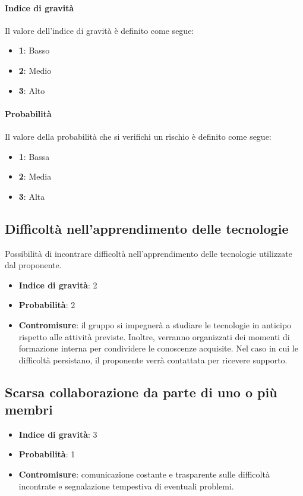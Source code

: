 \documentclass[italian,12pt]{article} %
\begin{document}
\paragraph{Indice di gravità} Il valore dell'indice di gravità è definito come segue:
\begin{itemize}
	\itemsep0em
	\item \textbf{1}: Basso
	\item \textbf{2}: Medio
	\item \textbf{3}: Alto
\end{itemize}

\paragraph{Probabilità} Il valore della probabilità che si verifichi un rischio è definito come segue:
\begin{itemize}
	\itemsep0em
	\item \textbf{1}: Bassa
	\item \textbf{2}: Media
	\item \textbf{3}: Alta
\end{itemize}

\subsection{Difficoltà nell'apprendimento delle tecnologie}
Possibilità di incontrare difficoltà nell'apprendimento delle tecnologie utilizzate dal proponente.
\begin{itemize}
	\item \textbf{Indice di gravità}: 2
	\item \textbf{Probabilità}: 2
	\item \textbf{Contromisure}: il gruppo si impegnerà a studiare le tecnologie in anticipo rispetto alle attività previste.
	      Inoltre, verranno organizzati dei momenti di formazione interna per condividere le conoscenze acquisite.
	      Nel caso in cui le difficoltà persistano, il proponente verrà contattata per ricevere supporto.
\end{itemize}

\subsection{Scarsa collaborazione da parte di uno o più membri}
\begin{itemize}
	\item \textbf{Indice di gravità}: 3
	\item \textbf{Probabilità}: 1
	\item \textbf{Contromisure}: comunicazione costante e trasparente sulle
	      difficoltà incontrate e segnalazione tempestiva di eventuali problemi.
\end{itemize}
\end{document}
